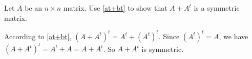 \documentclass{ximera}
\begin{document}
\begin{exercise} \label{YZ_1.3_sym4}
Let $A$ be an $n\times n$ matrix. Use \eqref{at+bt} to show that $A+A^t$ is a symmetric matrix.

\begin{solution}
\soln 
According to \eqref{at+bt}, $(A+A^t)^t=A^t+(A^t)^t$. Since $(A^t)^t=A$, we have 
$(A+A^t)^t=A^t+A=A+A^t$.
So $A+A^t$ is symmetric.
\end{solution}
\end{exercise}
\end{document}
